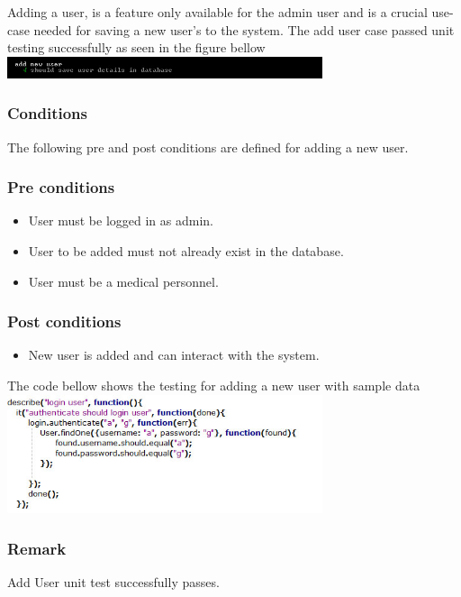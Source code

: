 
Adding a user, is a feature only available for the admin user and is a crucial use-case needed for saving a new user’s to the system.
\newline
\newline
The add user case passed unit testing successfully as seen in the figure bellow
\newline
\newline
\includegraphics[width=350px]{./TestingDoc/Graphics/addUser}
\newline		
\subsubsection*{Conditions}
The following pre and post conditions are defined for adding a new user.
\newline
\newline	
\subsubsection*{Pre conditions}	
\begin{itemize}
		\item User must be logged in as admin.
		\item User to be added must not already exist in the database.
		\item User must be a medical personnel.
\end{itemize}	

\subsubsection*{Post conditions}	
\begin{itemize}
		\item New user is added and can interact with the system.
\end{itemize}	

The code bellow shows the testing for adding a new user with sample data	
\newline
\newline
\includegraphics[width=350px]{./TestingDoc/Graphics/UserMustLogIn}

\subsubsection*{Remark}
Add User unit test successfully passes.